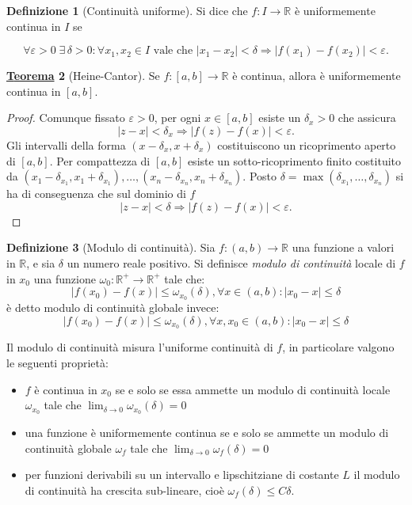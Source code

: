 \documentclass[a4paper,twoside]{article}
\renewcommand{\epsilon}{\varepsilon}
\newcommand{\R}{\mathbb{R}}
\theoremstyle{definition}
\newtheorem{theorem}{\color{Red}\underline{\textrm Teorema}}
\newtheorem{definizione}[theorem]{Definizione}
\numberwithin{theorem}{section}
\begin{document}
\begin{definizione}[Continuità uniforme]
Si dice che $f:I\to\R$ è uniformemente continua in $I$ se 


$$\forall\epsilon>0\; \exists\,\delta>0: \forall x_1,x_2\in I\text{ vale che } |x_1-x_2|<\delta \Rightarrow |f(x_1)-f(x_2)|<\epsilon.$$
\end{definizione}

\begin{theorem}[Heine-Cantor]
Se $f:[a,b]\to\R$ è continua, allora è uniformemente continua in $[a,b]$.
\end{theorem}
\begin{proof}
Comunque fissato $\epsilon > 0$, per ogni $x\in[a,b]$ esiste un $\delta_x > 0$ che assicura $$|z-x|<\delta_x\Longrightarrow|f(z)-f(x)|<\epsilon.$$
Gli intervalli della forma $(x-\delta_x, x+\delta_x)$ costituiscono un ricoprimento aperto di $[a,b]$. Per compattezza di $[a,b]$ esiste un sotto-ricoprimento finito costituito da $(x_1-\delta_{x_1},x_1+\delta_{x_1}),\ldots,(x_n-\delta_{x_n},x_n+\delta_{x_n})$. Posto $\delta=\max(\delta_{x_1},\ldots,\delta_{x_n})$ si ha di conseguenza che sul dominio di $f$
$$|z-x|<\delta\Longrightarrow|f(z)-f(x)|<\epsilon.$$
\end{proof}


\begin{definizione}[Modulo di continuità]
Sia $f:(a,b)\to\R$ una funzione a valori in $\R$, e sia $\delta$ un numero reale positivo. Si definisce \emph{modulo di continuità} locale di $f$ in $x_0$ una funzione $\omega_0:\R^+\to\R^+$  tale che:\\
$$|f(x_0)-f(x)|\leq\omega_{x_0}(\delta),\forall x\in(a,b):|x_0-x|\leq\delta$$ è detto modulo di continuità globale invece:
$$|f(x_0)-f(x)|\leq\omega_{x_0}(\delta),\forall x,x_0\in(a,b):|x_0-x|\leq\delta$$
\end{definizione}



Il modulo di continuità misura l'uniforme continuità di $f$, in particolare valgono le seguenti proprietà:
\begin{itemize}
 \item $f$ è continua in $x_0$ se e solo se essa ammette un modulo di continuità locale $\omega_{x_0}$ tale che $\lim_{\delta\to0}\omega_{x_0}(\delta)=0$
 \item una funzione è uniformemente continua se e solo se ammette un modulo di continuità globale $\omega_f$ tale che $\lim_{\delta\to 0}\omega_f(\delta)=0$
 \item per funzioni derivabili su un intervallo e lipschitziane di costante $L$ il modulo di continuità ha crescita sub-lineare, cioè $\omega_f(\delta)\leq C\delta$.
\end{itemize}
\end{document}
